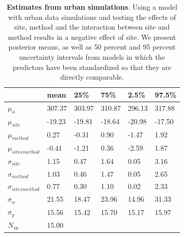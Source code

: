 \documentclass{article}\usepackage[]{graphicx}\usepackage[]{color}
\begin{document}
\begin{table}[ht]
\centering
\caption{\textbf{Estimates from urban simulations}. Using a model with urban data simulations and testing the effects of site, method and the interaction between site and method results in a negative effect of site. We present posterior means, as well as 50 percent and 95 percent uncertainty intervals from models in which the predictors have been standardized so that they are directly comparable.} 
\label{tab:urban}
\begingroup\footnotesize
\begin{tabular}{|p{}|p{}p{}p{}p{}p{}|}
  \hline
 & mean & 25\% & 75\% & 2.5\% & 97.5\% \\ 
  \hline
$\mu_{\alpha}$ & 307.37 & 303.97 & 310.87 & 296.13 & 317.88 \\ 
  $\mu_{site}$ & -19.23 & -19.81 & -18.64 & -20.98 & -17.50 \\ 
  $\mu_{method}$ & 0.27 & -0.31 & 0.90 & -1.47 & 1.92 \\ 
  $\mu_{sitexmethod}$ & -0.41 & -1.21 & 0.36 & -2.59 & 1.87 \\ 
  $\sigma_{site}$ & 1.15 & 0.47 & 1.64 & 0.05 & 3.16 \\ 
  $\sigma_{method}$ & 1.03 & 0.46 & 1.47 & 0.05 & 2.65 \\ 
  $\sigma_{sitexmethod}$ & 0.77 & 0.30 & 1.10 & 0.02 & 2.33 \\ 
  $\sigma_{\alpha}$ & 21.55 & 18.47 & 23.96 & 14.96 & 31.33 \\ 
  $\sigma_{y}$ & 15.56 & 15.42 & 15.70 & 15.17 & 15.97 \\ 
   \hline
$N_{sp}$ & 15.00 &  &  &  &  \\ 
   \hline
\end{tabular}
\endgroup
\end{table}
\end{document}
